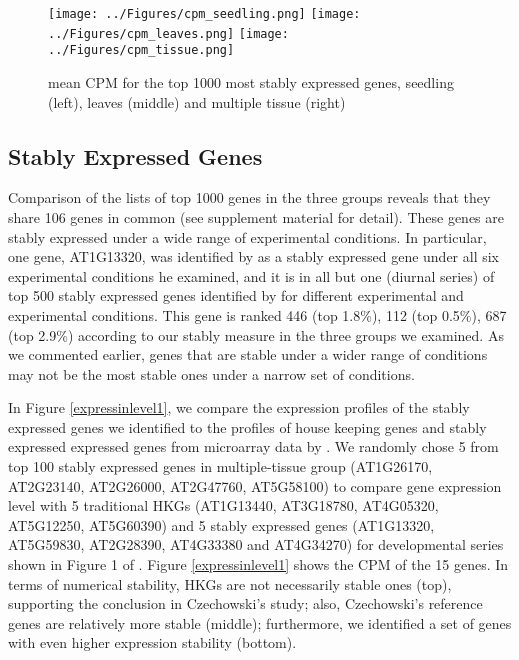 \documentclass[11pt, a4paper]{article}
\begin{document}
  \begin{figure}[H]
  	\begin{center}
  		\texttt{[image: ../Figures/cpm\_seedling.png]}
  		\texttt{[image: ../Figures/cpm\_leaves.png]}
  		\texttt{[image: ../Figures/cpm\_tissue.png]}
  		\caption{{\small{\label{cpm} mean CPM for the top 1000 most stably expressed genes, seedling (left), leaves (middle) and multiple tissue (right) }}}
  	\end{center}
  \end{figure} 
  
 \subsection{Stably Expressed Genes}\label{section:stablyExpressedGene}

Comparison of the lists of top 1000 genes in the three groups reveals that
they share 106 genes in common (see supplement material for detail). 
These genes are stably expressed under a wide range of experimental
conditions.  %
In particular, one gene, AT1G13320, was identified by
\cite{hong2010identification} as a stably expressed gene under all six
experimental conditions he examined, and it is in all but one (diurnal series) of top 500 stably
expressed genes identified by \cite{czechowski2005genome} for different
experimental and experimental conditions.
This gene is ranked 446 (top 1.8\%), 112 (top 0.5\%), 687 (top 2.9\%) according to our stably measure in the three
groups we examined. As we commented earlier, genes that are stable under a
wider range of conditions may not be the most stable ones under a narrow set
of conditions.

In Figure \ref{expressinlevel1}, we compare the expression profiles of the stably expressed
genes we identified to the profiles of house keeping genes and stably
expressed expressed genes from microarray data by \cite{czechowski2005genome}.
We randomly chose 5 from top 100 stably expressed genes in multiple-tissue group (AT1G26170, AT2G23140, AT2G26000, AT2G47760, AT5G58100) to compare gene expression level with 5 traditional HKGs
(AT1G13440, AT3G18780, AT4G05320, AT5G12250, AT5G60390) and 5 stably expressed genes  (AT1G13320, AT5G59830, AT2G28390, AT4G33380 and AT4G34270) for developmental series shown in Figure 1 of \cite{czechowski2005genome}. Figure
\ref{expressinlevel1} shows the CPM of the 15 genes. In terms of numerical
stability, HKGs are not necessarily stable ones (top), supporting the
conclusion in Czechowski's study; also, Czechowski's reference genes are
relatively more stable (middle); furthermore, we identified a set of
genes with even higher expression stability (bottom).
\end{document}
